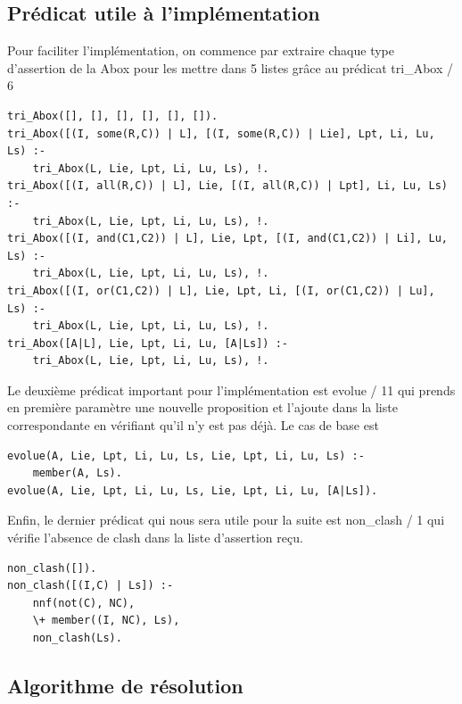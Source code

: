 \documentclass{article}
\begin{document}
\subsection{Prédicat utile à l'implémentation}
Pour faciliter l'implémentation, on commence par extraire chaque type d'assertion de la Abox pour les mettre dans 5 listes grâce au prédicat \color{blue} tri\_Abox / 6 \color{black}
\begin{verbatim}
tri_Abox([], [], [], [], [], []).
tri_Abox([(I, some(R,C)) | L], [(I, some(R,C)) | Lie], Lpt, Li, Lu, Ls) :-
    tri_Abox(L, Lie, Lpt, Li, Lu, Ls), !.
tri_Abox([(I, all(R,C)) | L], Lie, [(I, all(R,C)) | Lpt], Li, Lu, Ls) :-
    tri_Abox(L, Lie, Lpt, Li, Lu, Ls), !.
tri_Abox([(I, and(C1,C2)) | L], Lie, Lpt, [(I, and(C1,C2)) | Li], Lu, Ls) :-
    tri_Abox(L, Lie, Lpt, Li, Lu, Ls), !.
tri_Abox([(I, or(C1,C2)) | L], Lie, Lpt, Li, [(I, or(C1,C2)) | Lu], Ls) :-
    tri_Abox(L, Lie, Lpt, Li, Lu, Ls), !.
tri_Abox([A|L], Lie, Lpt, Li, Lu, [A|Ls]) :-
    tri_Abox(L, Lie, Lpt, Li, Lu, Ls), !.
\end{verbatim}

Le deuxième prédicat important pour l'implémentation est \color{blue} evolue / 11 \color{black} qui prends en première paramètre une nouvelle proposition et l'ajoute dans la liste correspondante en vérifiant qu'il n'y est pas déjà. Le cas de base est 
\begin{verbatim}
evolue(A, Lie, Lpt, Li, Lu, Ls, Lie, Lpt, Li, Lu, Ls) :-
    member(A, Ls).
evolue(A, Lie, Lpt, Li, Lu, Ls, Lie, Lpt, Li, Lu, [A|Ls]).
\end{verbatim}

Enfin, le dernier prédicat qui nous sera utile pour la suite est \color{blue} non\_clash / 1 \color{black} qui vérifie l'absence de clash dans la liste d'assertion reçu.
\begin{verbatim}
non_clash([]).
non_clash([(I,C) | Ls]) :-
    nnf(not(C), NC),
    \+ member((I, NC), Ls),
    non_clash(Ls).
\end{verbatim}

\subsection{Algorithme de résolution}
\end{document}
